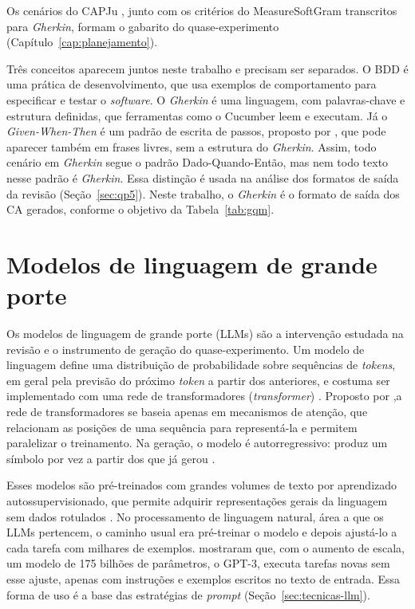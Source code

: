 
Os cenários do CAPJu \cite{capju2026cenarios}, junto com os critérios do MeasureSoftGram transcritos para \textit{Gherkin}, formam o gabarito do quase-experimento (Capítulo~\ref{cap:planejamento}).

Três conceitos aparecem juntos neste trabalho e precisam ser separados. O BDD é uma prática de desenvolvimento, que usa exemplos de comportamento para especificar e testar o \textit{software}. O \textit{Gherkin} é uma linguagem, com palavras-chave e estrutura definidas, que ferramentas como o Cucumber leem e executam. Já o \textit{Given-When-Then} é um padrão de escrita de passos, proposto por , que pode aparecer também em frases livres, sem a estrutura do \textit{Gherkin}. Assim, todo cenário em \textit{Gherkin} segue o padrão Dado-Quando-Então, mas nem todo texto nesse padrão é \textit{Gherkin}. Essa distinção é usada na análise dos formatos de saída da revisão (Seção~\ref{sec:qp5}). Neste trabalho, o \textit{Gherkin} é o formato de saída dos CA gerados, conforme o objetivo da Tabela~\ref{tab:gqm}.

\section{Modelos de linguagem de grande porte}
\label{sec:llm}

Os modelos de linguagem de grande porte (LLMs) são a intervenção estudada na revisão e o instrumento de geração do quase-experimento. Um modelo de linguagem define uma distribuição de probabilidade sobre sequências de \textit{tokens}, em geral pela previsão do próximo \textit{token} a partir dos anteriores, e costuma ser implementado com uma rede de transformadores (\textit{transformer}) \cite{ram2023}. Proposto por ,a rede de transformadores  se baseia apenas em mecanismos de atenção, que relacionam as posições de uma sequência para representá-la e permitem paralelizar o treinamento. Na geração, o modelo é autorregressivo: produz um símbolo por vez a partir dos que já gerou \cite{vaswani2017}.

Esses modelos são pré-treinados com grandes volumes de texto por aprendizado autossupervisionado, que permite adquirir representações gerais da linguagem sem dados rotulados \cite{cheng2026}. No processamento de linguagem natural, área a que os LLMs pertencem, o caminho usual era pré-treinar o modelo e depois ajustá-lo a cada tarefa com milhares de exemplos.  mostraram que, com o aumento de escala, um modelo de 175 bilhões de parâmetros, o GPT-3, executa tarefas novas sem esse ajuste, apenas com instruções e exemplos escritos no texto de entrada. Essa forma de uso é a base das estratégias de \textit{prompt} (Seção~\ref{sec:tecnicas-llm}).

